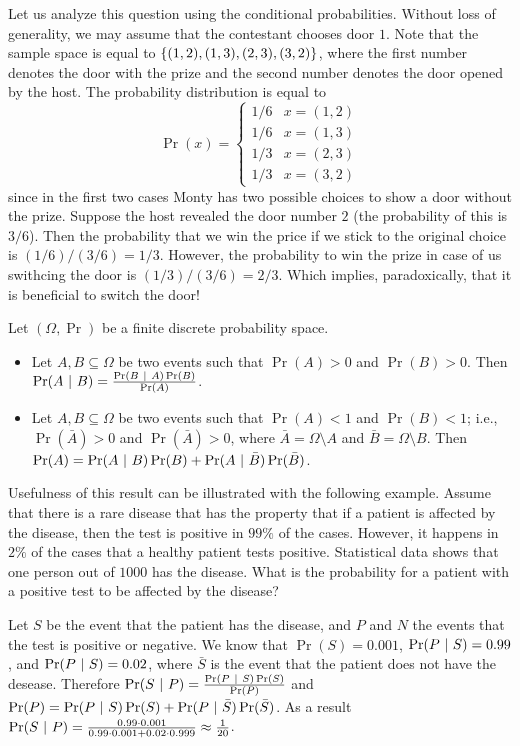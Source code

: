 Let us analyze this question using the conditional probabilities. Without loss
of generality, we may assume that the contestant chooses door $1$.
Note that the sample space is equal to $\set{(1, 2), (1, 3), (2, 3), (3, 2)}$,
where the first number denotes the door with the prize and the second number
denotes the door opened by the host. The probability distribution is equal to 
\[
  \Pr(x) = 
  \begin{cases}
    1 / 6 & x = (1, 2) \\
    1 / 6 & x = (1, 3) \\
    1 / 3 & x = (2, 3) \\
    1 / 3 & x = (3, 2)
  \end{cases}
\]
since in the first two cases Monty has two possible choices to show a door
without the prize.
Suppose the host revealed the door number $2$ (the probability of this is
$3 / 6$). Then the probability that we win the price if we stick to the original
choice is $(1 / 6) / (3 / 6) = 1 / 3$. However, the probability to win the prize
in case of us swithcing the door is $(1 / 3) / (3 / 6) = 2 / 3$. Which implies,
paradoxically, that it is beneficial to switch the door!

\begin{theorem}
  Let $(\Omega, \Pr)$ be a finite discrete probability space. 
  \begin{itemize}
    \item Let $A, B \subseteq \Omega$ be two events such that $\Pr(A) > 0$ and
      $\Pr(B) > 0$. Then $\Pr(A ~\rvert~ B) = \frac{\Pr(B ~\rvert~ A) \Pr(B)}{\Pr(A)}$.
    \item Let $A, B \subseteq \Omega$ be two events such that $\Pr(A) < 1$ and
      $\Pr(B) < 1$; i.e., $\Pr(\bar{A}) > 0$ and $\Pr(\bar{A}) > 0$, where
      $\bar{A} = \Omega \setminus A$ and $\bar{B} = \Omega \setminus B$.
      Then $\Pr(A) = \Pr(A ~\rvert~ B)\Pr(B) + \Pr(A ~\rvert~ \bar{B})\Pr(\bar{B})$.
  \end{itemize}
\end{theorem}


Usefulness of this result can be illustrated with the following example. Assume
that there is a rare disease that has the property that if a patient is affected
by the disease, then the test is positive in $99\%$ of the cases. However, it
happens in $2\%$ of the cases that a healthy patient tests positive. Statistical
data shows that one person out of $1000$ has the disease. What is the
probability for a patient with a positive test to be affected by the disease?

Let $S$ be the event that the patient has the disease, and $P$ and $N$ the
events that the test is positive or negative. We know that $\Pr(S) = 0.001$,
$\Pr(P ~\rvert~ S) = 0.99$, and $\Pr(P ~\rvert~ S) = 0.02$, where $\bar{S}$ is the
event that the patient does not have the desease. Therefore $\Pr(S ~\rvert~ P) =
\frac{\Pr(P ~\rvert~ S) \Pr(S)}{\Pr(P)}$ and $\Pr(P) = \Pr(P ~\rvert~ S) \Pr(S) +
\Pr(P ~\rvert~ \bar{S}) \Pr(\bar{S})$. As a result $\Pr(S ~\rvert~ P) = 
\frac{0.99 \cdot 0.001}{0.99 \cdot 0.001 + 0.02 \cdot 0.999} \approx
\frac{1}{20}$.

